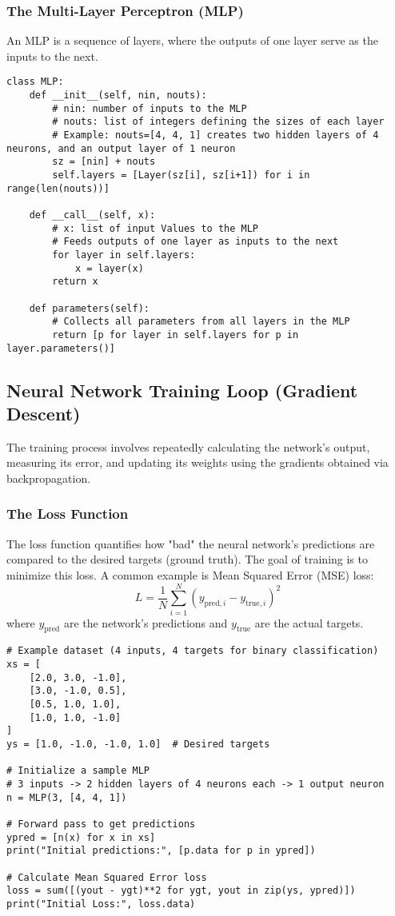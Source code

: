 \subsubsection{The Multi-Layer Perceptron (MLP)} 
An MLP is a sequence of layers, where the outputs of one layer serve as the inputs to the next.

\begin{lstlisting}[caption={MLP Class Implementation}] 
class MLP: 
    def __init__(self, nin, nouts): 
        # nin: number of inputs to the MLP 
        # nouts: list of integers defining the sizes of each layer 
        # Example: nouts=[4, 4, 1] creates two hidden layers of 4 neurons, and an output layer of 1 neuron 
        sz = [nin] + nouts 
        self.layers = [Layer(sz[i], sz[i+1]) for i in range(len(nouts))]

    def __call__(self, x):
        # x: list of input Values to the MLP
        # Feeds outputs of one layer as inputs to the next
        for layer in self.layers:
            x = layer(x)
        return x

    def parameters(self):
        # Collects all parameters from all layers in the MLP
        return [p for layer in self.layers for p in layer.parameters()]
\end{lstlisting}

\subsection{Neural Network Training Loop (Gradient Descent)}
The training process involves repeatedly calculating the network's output, measuring its error, and updating its weights using the gradients obtained via backpropagation.

\subsubsection{The Loss Function} 
The loss function quantifies how "bad" the neural network's predictions are compared to the desired targets (ground truth). The goal of training is to minimize this loss. A common example is Mean Squared Error (MSE) loss: 
$$ L = \frac{1}{N} \sum_{i=1}^{N} (y_{\text{pred},i} - y_{\text{true},i})^2 $$ 
where $y_{\text{pred}}$ are the network's predictions and $y_{\text{true}}$ are the actual targets.

\begin{lstlisting}[caption={Example Data and Loss Calculation}]
# Example dataset (4 inputs, 4 targets for binary classification)
xs = [ 
    [2.0, 3.0, -1.0], 
    [3.0, -1.0, 0.5], 
    [0.5, 1.0, 1.0], 
    [1.0, 1.0, -1.0]
] 
ys = [1.0, -1.0, -1.0, 1.0]  # Desired targets

# Initialize a sample MLP
# 3 inputs -> 2 hidden layers of 4 neurons each -> 1 output neuron
n = MLP(3, [4, 4, 1])

# Forward pass to get predictions
ypred = [n(x) for x in xs] 
print("Initial predictions:", [p.data for p in ypred])

# Calculate Mean Squared Error loss
loss = sum([(yout - ygt)**2 for ygt, yout in zip(ys, ypred)]) 
print("Initial Loss:", loss.data) 
\end{lstlisting}

